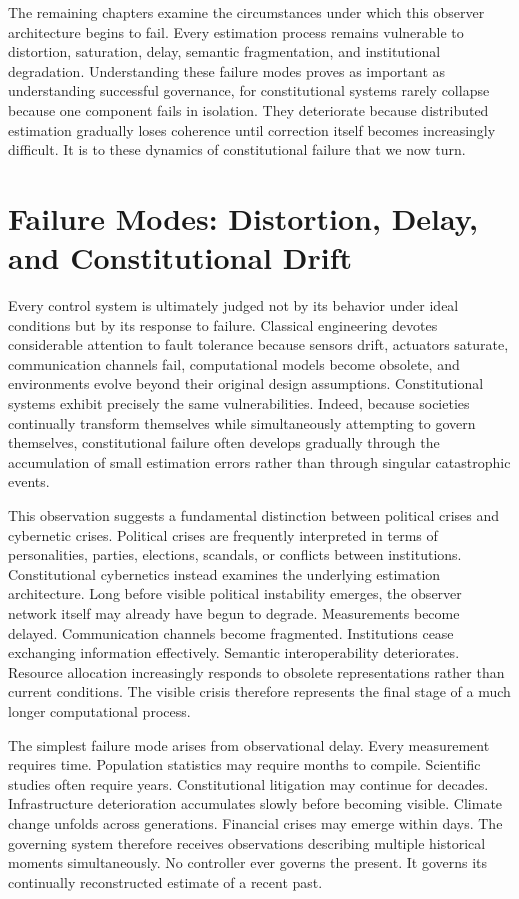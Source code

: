 \documentclass[12pt,a4paper]{article}
\begin{document}
The remaining chapters examine the circumstances under which this observer architecture begins to fail. Every estimation process remains vulnerable to distortion, saturation, delay, semantic fragmentation, and institutional degradation. Understanding these failure modes proves as important as understanding successful governance, for constitutional systems rarely collapse because one component fails in isolation. They deteriorate because distributed estimation gradually loses coherence until correction itself becomes increasingly difficult. It is to these dynamics of constitutional failure that we now turn.

\section{Failure Modes: Distortion, Delay, and Constitutional Drift}

Every control system is ultimately judged not by its behavior under ideal conditions but by its response to failure. Classical engineering devotes considerable attention to fault tolerance because sensors drift, actuators saturate, communication channels fail, computational models become obsolete, and environments evolve beyond their original design assumptions. Constitutional systems exhibit precisely the same vulnerabilities. Indeed, because societies continually transform themselves while simultaneously attempting to govern themselves, constitutional failure often develops gradually through the accumulation of small estimation errors rather than through singular catastrophic events.

This observation suggests a fundamental distinction between political crises and cybernetic crises. Political crises are frequently interpreted in terms of personalities, parties, elections, scandals, or conflicts between institutions. Constitutional cybernetics instead examines the underlying estimation architecture. Long before visible political instability emerges, the observer network itself may already have begun to degrade. Measurements become delayed. Communication channels become fragmented. Institutions cease exchanging information effectively. Semantic interoperability deteriorates. Resource allocation increasingly responds to obsolete representations rather than current conditions. The visible crisis therefore represents the final stage of a much longer computational process.

The simplest failure mode arises from observational delay. Every measurement requires time. Population statistics may require months to compile. Scientific studies often require years. Constitutional litigation may continue for decades. Infrastructure deterioration accumulates slowly before becoming visible. Climate change unfolds across generations. Financial crises may emerge within days. The governing system therefore receives observations describing multiple historical moments simultaneously. No controller ever governs the present. It governs its continually reconstructed estimate of a recent past.
\end{document}
